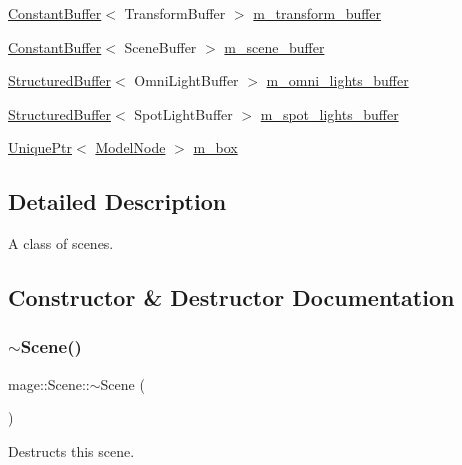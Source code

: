 \begin{DoxyCompactItemize}
\item 
\hyperlink{structmage_1_1_constant_buffer}{Constant\+Buffer}$<$ Transform\+Buffer $>$ \hyperlink{classmage_1_1_scene_a2e57c981725d0a64bfc8f82381ac3d6a}{m\+\_\+transform\+\_\+buffer}
\item 
\hyperlink{structmage_1_1_constant_buffer}{Constant\+Buffer}$<$ Scene\+Buffer $>$ \hyperlink{classmage_1_1_scene_a8b883db7e3f4d2ac1212a99e38388b08}{m\+\_\+scene\+\_\+buffer}
\item 
\hyperlink{structmage_1_1_structured_buffer}{Structured\+Buffer}$<$ Omni\+Light\+Buffer $>$ \hyperlink{classmage_1_1_scene_a274ed5e548431ba805513a86a00bbaf1}{m\+\_\+omni\+\_\+lights\+\_\+buffer}
\item 
\hyperlink{structmage_1_1_structured_buffer}{Structured\+Buffer}$<$ Spot\+Light\+Buffer $>$ \hyperlink{classmage_1_1_scene_a64118c052d728ac988031898fd2d757d}{m\+\_\+spot\+\_\+lights\+\_\+buffer}
\item 
\hyperlink{namespacemage_a3316d7143a973e37adf1110f2e80ca31}{Unique\+Ptr}$<$ \hyperlink{classmage_1_1_model_node}{Model\+Node} $>$ \hyperlink{classmage_1_1_scene_a9262224724837e9840677615a6eb5507}{m\+\_\+box}
\end{DoxyCompactItemize}


\subsection{Detailed Description}
A class of scenes. 

\subsection{Constructor \& Destructor Documentation}
\hypertarget{classmage_1_1_scene_adc40910fdca62586659c2961fe7e7f3c}{}\label{classmage_1_1_scene_adc40910fdca62586659c2961fe7e7f3c} 
\subsubsection{\texorpdfstring{$\sim$\+Scene()}{~Scene()}}
{\footnotesize\ttfamily mage\+::\+Scene\+::$\sim$\+Scene (\begin{DoxyParamCaption}{ }\end{DoxyParamCaption})\hspace{0.3cm}{\ttfamily [virtual]}}

Destructs this scene. \hypertarget{classmage_1_1_scene_aab61b38547fc53aa9c5b3b559f4d2e26}{}\label{classmage_1_1_scene_aab61b38547fc53aa9c5b3b559f4d2e26} 
